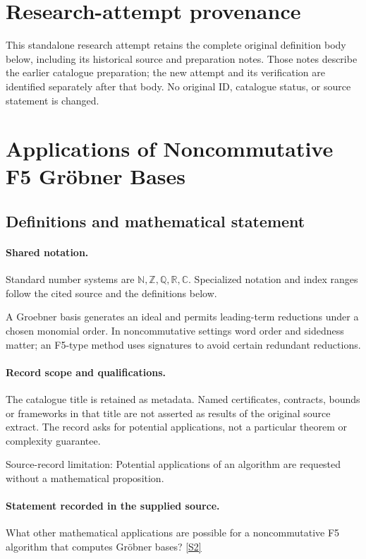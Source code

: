 \documentclass[11pt]{article}
\begin{document}
\section*{Research-attempt provenance}
This standalone research attempt retains the complete original definition body below,
including its historical source and preparation notes. Those notes describe the
earlier catalogue preparation; the new attempt and its verification are identified
separately after that body. No original ID, catalogue status, or source statement is changed.

\section{Applications of Noncommutative F5 Gröbner Bases}\label{statement}

\subsection{Definitions and mathematical statement}

\paragraph{Shared notation.}Standard number systems are $\mathbb N,\mathbb Z,\mathbb Q,\mathbb R,\mathbb C$. Specialized notation and index ranges follow the cited source and the definitions below.


A Groebner basis generates an ideal and permits leading-term reductions under a chosen monomial order. In noncommutative settings word order and sidedness matter; an F5-type method uses signatures to avoid certain redundant reductions.
\paragraph{Record scope and qualifications.}
The catalogue title is retained as metadata. Named certificates, contracts, bounds or frameworks in that title are not asserted as results of the original source extract.
The record asks for potential applications, not a particular theorem or complexity guarantee.

Source-record limitation: Potential applications of an algorithm are requested without a mathematical proposition.
\paragraph{Statement recorded in the supplied source.}
What other mathematical applications are possible for a noncommutative F5 algorithm that computes Gröbner bases? \href{https://doi.org/10.4171/owr/2016/37}{[S2]}
\end{document}

